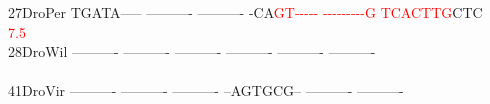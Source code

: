 \documentclass[11pt,twoside,reqno,a4paper]{article}
\begin{document}
{27\hspace*{2\charwidth}DroPer	TGATA-----	----------	----------	-CA\textcolor{red}{G}\textcolor{red}{T}\textcolor{red}{-}\textcolor{red}{-}\textcolor{red}{-}\textcolor{red}{-}\textcolor{red}{-}	\textcolor{red}{-}\textcolor{red}{-}\textcolor{red}{-}\textcolor{red}{-}\textcolor{red}{-}\textcolor{red}{-}\textcolor{red}{-}\textcolor{red}{-}\textcolor{red}{-}\textcolor{red}{G}	\textcolor{red}{T}\textcolor{red}{C}\textcolor{red}{A}\textcolor{red}{C}\textcolor{red}{T}\textcolor{red}{T}\textcolor{red}{G}CTC	\\
\hspace*{4\charwidth}\hspace*{7\charwidth}\hspace*{1\charwidth}\hspace*{1\charwidth}\hspace*{1\charwidth}\hspace*{33\charwidth}\textcolor{red}{7.5}\hspace*{1\charwidth}\hspace*{1\charwidth}\hspace*{1\charwidth}\\
28\hspace*{2\charwidth}DroWil	----------	----------	----------	----------	----------	----------	\\
\hspace*{4\charwidth}\hspace*{7\charwidth}\hspace*{1\charwidth}\hspace*{1\charwidth}\hspace*{1\charwidth}\hspace*{1\charwidth}\hspace*{1\charwidth}\hspace*{1\charwidth}\\
41\hspace*{2\charwidth}DroVir	----------	----------	----------	--AGTGCG--	----------	----------	\\
\hspace*{4\charwidth}\hspace*{7\charwidth}\hspace*{1\charwidth}\hspace*{1\charwidth}\hspace*{1\charwidth}\hspace*{1\charwidth}\hspace*{1\charwidth}\hspace*{1\charwidth}\\
}
\end{document}
